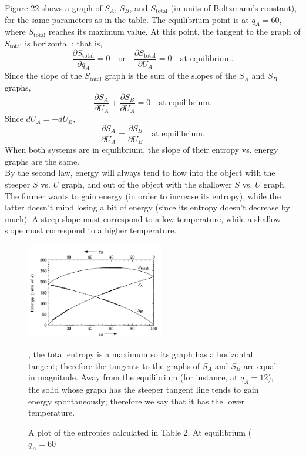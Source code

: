 \documentclass[11pt]{exam}
\begin{document}
Figure 22 shows a graph of $S_A$, $S_B$, and $S_\text{total}$ (in units of Boltzmann's constant), for the same parameters as in the table. The equilibrium point is at $q_A=60$, where $S_\text{total}$ reaches its maximum value. At this point, the tangent to the graph of $S_\text{total}$ is horizontal ; that is, 
\begin{equation}\tag{3.1}
\frac{\partial S_\text{total}}{\partial q_A}=0\quad\text{or}\quad\frac{\partial S_\text{total}}{\partial U_A}=0\quad\text{at equilibrium.}
\end{equation}
Since the slope of the $S_\text{total}$ graph is the sum of the slopes of the $S_A$ and $S_B$ graphs, 
\begin{equation}\tag{3.2}
\frac{\partial S_A}{\partial U_A}+\frac{\partial S_B}{\partial U_A}=0\quad\text{at equilibrium.} 
\end{equation}
Since $dU_A = -dU_B$, 
\begin{equation}\tag{3.3}
\frac{\partial S_A}{\partial U_A}=\frac{\partial S_B}{\partial U_B} \quad\text{at equilibrium.}
\end{equation}
When both systems are in equilibrium, the slope of their entropy vs. energy graphs are the same.\\
\hspace*{10mm}By the second law, energy will always tend to flow into the object with the steeper $S$ vs. $U$ graph, and out of the object with the shallower $S$ vs. $U$ graph. The former wants to gain energy (in order to increase its entropy), while the latter doesn't mind losing a bit of energy (since its entropy doesn't decrease by much). A steep slope must correspond to a low temperature, while a shallow slope must correspond to a higher temperature.\\
\begin{figure}[htp]
    \centering
    \includegraphics[width=6cm]{figure22.png}
    \caption{A plot of the entropies calculated in Table 2. At equilibrium ($q_A=60$}, the total entropy is a maximum so its graph has a horizontal tangent; therefore the tangents to the graphs of $S_A$ and $S_B$ are equal in magnitude. Away from the equilibrium (for instance, at $q_A=12$), the solid whose graph has the steeper tangent line tends to gain energy spontaneously; therefore we say that it has the lower temperature. 
\label{fig:entropy_plot}
\end{figure}\\
\end{document}

